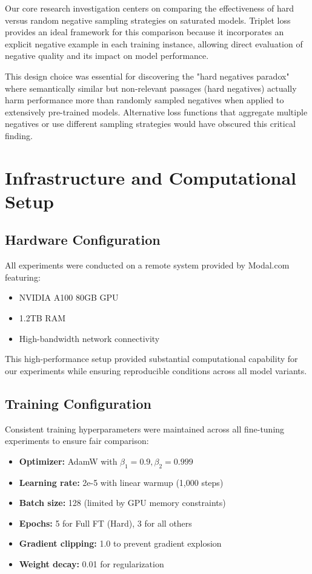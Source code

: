 Our core research investigation centers on comparing the effectiveness of hard versus random negative sampling strategies on saturated models. Triplet loss provides an ideal framework for this comparison because it incorporates an explicit negative example in each training instance, allowing direct evaluation of negative quality and its impact on model performance.

This design choice was essential for discovering the "hard negatives paradox" where semantically similar but non-relevant passages (hard negatives) actually harm performance more than randomly sampled negatives when applied to extensively pre-trained models. Alternative loss functions that aggregate multiple negatives or use different sampling strategies would have obscured this critical finding.

\section{Infrastructure and Computational Setup}

\subsection{Hardware Configuration}

All experiments were conducted on a remote system provided by Modal.com \cite{modal2023} featuring:
\begin{itemize}
\item NVIDIA A100 80GB GPU
\item 1.2TB RAM
\item High-bandwidth network connectivity
\end{itemize}

This high-performance setup provided substantial computational capability for our experiments while ensuring reproducible conditions across all model variants.

\subsection{Training Configuration}

Consistent training hyperparameters were maintained across all fine-tuning experiments to ensure fair comparison:

\begin{itemize}
\item \textbf{Optimizer:} AdamW \cite{loshchilov2017decoupled} with $\beta_1=0.9, \beta_2=0.999$
\item \textbf{Learning rate:} 2e-5 with linear warmup (1,000 steps)
\item \textbf{Batch size:} 128 (limited by GPU memory constraints)
\item \textbf{Epochs:} 5 for Full FT (Hard), 3 for all others
\item \textbf{Gradient clipping:} 1.0 to prevent gradient explosion
\item \textbf{Weight decay:} 0.01 for regularization
\end{itemize}

